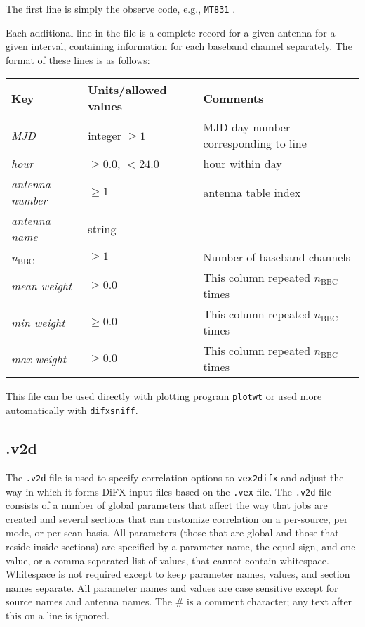 The first line is simply the observe code, e.g., {\tt MT831} .

Each additional line in the file is a complete record for a given antenna for a given interval, containing information for each baseband channel separately.
The format of these lines is as follows:

\begin{center}
\begin{tabular}{l l l}
\hline
Key & Units/allowed values & Comments \\
\hline
{\it MJD}                & integer $\ge 1$     & MJD day number corresponding to line \\
{\it hour}               & $\ge 0.0$, $< 24.0$ & hour within day \\
{\it antenna number}     & $\ge 1$             & antenna table index \\
{\it antenna name}       & string              & \\
{\it n}$_{\mathrm{BBC}}$ & $\ge 1$             & Number of baseband channels \\
{\it mean weight}        & $\ge 0.0$           & This column repeated $n_{\mathrm{BBC}}$ times \\
{\it min weight}         & $\ge 0.0$           & This column repeated $n_{\mathrm{BBC}}$ times \\
{\it max weight}         & $\ge 0.0$           & This column repeated $n_{\mathrm{BBC}}$ times \\
\hline
\end{tabular}
\end{center}

\noindent
This file can be used directly with plotting program {\tt plotwt} or used more automatically with {\tt difxsniff}.










\subsection{.v2d} \label{sec:v2d}

The {\tt .v2d} file is used to specify correlation options to {\tt vex2difx} and adjust the way in which it forms DiFX input files based on the {\tt .vex} file.
The {\tt .v2d} file consists of a number of global parameters that affect the way that jobs are created and several sections that can customize correlation on a per-source, per mode, or per scan basis.  
All parameters (those that are global and those that reside inside sections) are specified by a parameter name, the equal sign, and one value, or a comma-separated list of values, that cannot contain whitespace.  
Whitespace is not required except to keep parameter names, values, and section names separate.  
All parameter names and values are case sensitive except for source names and antenna names.  
The \# is a comment character; any text after this on a line is ignored.

